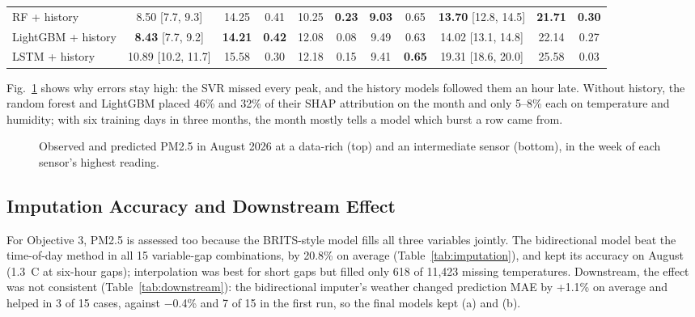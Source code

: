 \documentclass{ieeeaccess}
\begin{document}
\begin{table}[t]
\begin{tabular}{lcccccccccc}
RF + history & 8.50 {\scriptsize[7.7, 9.3]} & 14.25 & 0.41 & 10.25 & \textbf{0.23} & \textbf{9.03} & 0.65 & \textbf{13.70} {\scriptsize[12.8, 14.5]} & \textbf{21.71} & \textbf{0.30} \\
LightGBM + history & \textbf{8.43} {\scriptsize[7.7, 9.2]} & \textbf{14.21} & \textbf{0.42} & 12.08 & 0.08 & 9.49 & 0.63 & 14.02 {\scriptsize[13.1, 14.8]} & 22.14 & 0.27 \\
LSTM + history & 10.89 {\scriptsize[10.2, 11.7]} & 15.58 & 0.30 & 12.18 & 0.15 & 9.41 & \textbf{0.65} & 19.31 {\scriptsize[18.6, 20.0]} & 25.58 & 0.03 \\
\bottomrule
\end{tabular}
\end{table}

Fig.~\ref{fig:obspred} shows why errors stay high: the SVR missed every peak, and the history models followed them an hour late. Without history, the random forest and LightGBM placed 46\% and 32\% of their SHAP attribution on the month and only 5--8\% each on temperature and humidity; with six training days in three months, the month mostly tells a model which burst a row came from.

\begin{figure}[t]
\centering

\caption{Observed and predicted PM2.5 in August 2026 at a data-rich (top) and an intermediate sensor (bottom), in the week of each sensor's highest reading.}
\label{fig:obspred}
\end{figure}

\subsection{Imputation Accuracy and Downstream Effect}\label{sec:imputation-accuracy-and-downstream-effect}

For Objective 3, PM2.5 is assessed too because the BRITS-style model fills all three variables jointly. The bidirectional model beat the time-of-day method in all 15 variable-gap combinations, by 20.8\% on average (Table~\ref{tab:imputation}), and kept its accuracy on August (1.3~\textdegree{}C at six-hour gaps); interpolation was best for short gaps but filled only 618 of 11,423 missing temperatures. Downstream, the effect was not consistent (Table~\ref{tab:downstream}): the bidirectional imputer's weather changed prediction MAE by +1.1\% on average and helped in 3 of 15 cases, against $-$0.4\% and 7 of 15 in the first run, so the final models kept (a) and (b).
\end{document}
